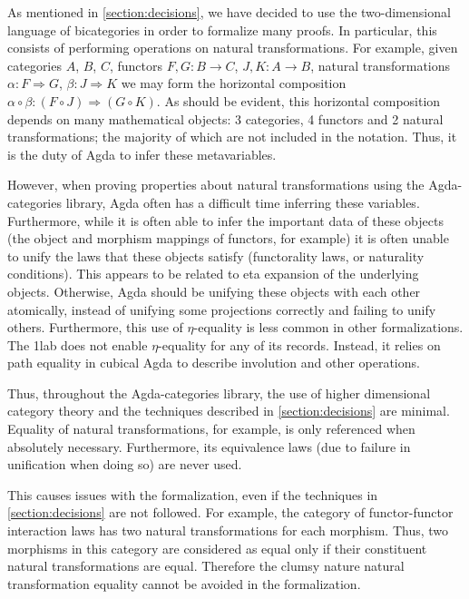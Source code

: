 \documentclass{amsart}
\theoremstyle{remark}
\begin{document}
As mentioned in \cref{section:decisions}, we have decided to use the two-dimensional language of bicategories in order to formalize many proofs. In particular, this consists of performing operations on natural transformations. For example, given categories $A$, $B$, $C$, functors $F, G\colon B\to C$, $J, K\colon A\to B$, natural transformations $\alpha\colon F\Rightarrow G$, $\beta\colon J\Rightarrow K$ we may form the horizontal composition $\alpha\circ\beta\colon (F\circ J)\Rightarrow(G\circ K)$. As should be evident, this horizontal composition depends on many mathematical objects: 3 categories, 4 functors and 2 natural transformations; the majority of which are not included in the notation. Thus, it is the duty of Agda to infer these metavariables.

However, when proving properties about natural transformations using the Agda-categories library, Agda often has a difficult time inferring these variables. Furthermore, while it is often able to infer the important data of these objects (the object and morphism mappings of functors, for example) it is often unable to unify the laws that these objects satisfy (functorality laws, or naturality conditions). This appears to be related to eta expansion of the underlying objects. Otherwise, Agda should be unifying these objects with each other atomically, instead of unifying some projections correctly and failing to unify others. Furthermore, this use of $\eta$-equality is less common in other formalizations. The 1lab\cite{agda:1lab} does not enable $\eta$-equality for any of its records. Instead, it relies on path equality in cubical Agda to describe involution and other operations.

Thus, throughout the Agda-categories library, the use of higher dimensional category theory and the techniques described in \cref{section:decisions} are minimal. Equality of natural transformations, for example, is only referenced when absolutely necessary. Furthermore, its equivalence laws (due to failure in unification when doing so) are never used.

This causes issues with the formalization, even if the techniques in \cref{section:decisions} are not followed. For example, the category of functor-functor interaction laws has two natural transformations for each morphism. Thus, two morphisms in this category are considered as equal only if their constituent natural transformations are equal. Therefore the clumsy nature natural transformation equality cannot be avoided in the formalization.
\end{document}
